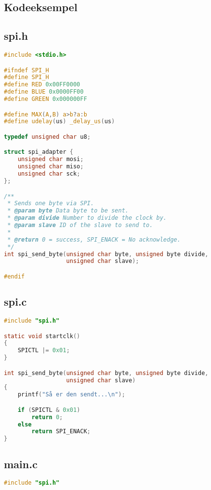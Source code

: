 \documentclass[article, 10pt]{memoir}
\begin{document}
\clearpage
\begin{landscape}
\begin{multicols}{2}
\chapter{Kodeeksempel}
\section{spi.h}

\begin{lstlisting}[language=c]
#include <stdio.h>

#ifndef SPI_H
#define SPI_H
#define RED 0x00FF0000
#define BLUE 0x0000FF00
#define GREEN 0x000000FF

#define MAX(A,B) a>b?a:b
#define udelay(us) _delay_us(us)

typedef unsigned char u8;

struct spi_adapter {
    unsigned char mosi;
    unsigned char miso;
    unsigned char sck;
};

/**
 * Sends one byte via SPI.
 * @param byte Data byte to be sent.
 * @param divide Number to divide the clock by.
 * @param slave ID of the slave to send to.
 *
 * @return 0 = success, SPI_ENACK = No acknowledge.
 */
int spi_send_byte(unsigned char byte, unsigned byte divide,
                  unsigned char slave);

#endif
\end{lstlisting}

\vfill
\columnbreak
\section{spi.c}
\begin{lstlisting}[language=c]
#include "spi.h"

static void startclk()
{
    SPICTL |= 0x01;
}

int spi_send_byte(unsigned char byte, unsigned byte divide,
                  unsigned char slave)
{
    printf("Så er den sendt...\n");

    if (SPICTL & 0x01)
        return 0;
    else
        return SPI_ENACK;
}

\end{lstlisting}

\vfill
\columnbreak

\section{main.c}
\begin{lstlisting}[language=c]
#include "spi.h"


\end{lstlisting}
\end{multicols}
\end{landscape}
\end{document}
